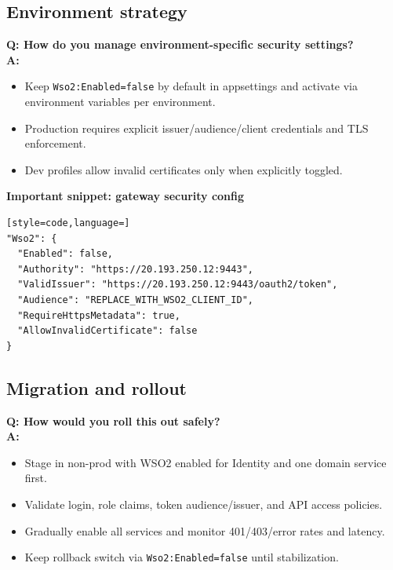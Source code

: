 \documentclass[11pt,a4paper]{article}
\begin{document}
\subsection{Environment strategy}
\textbf{Q: How do you manage environment-specific security settings?}\\
\textbf{A:}
\begin{itemize}[leftmargin=*]
  \item Keep \texttt{Wso2:Enabled=false} by default in appsettings and activate via environment variables per environment.
  \item Production requires explicit issuer/audience/client credentials and TLS enforcement.
  \item Dev profiles allow invalid certificates only when explicitly toggled.
\end{itemize}

\textbf{Important snippet: gateway security config}\newline
\begin{lstlisting}[style=code,language=]
"Wso2": {
  "Enabled": false,
  "Authority": "https://20.193.250.12:9443",
  "ValidIssuer": "https://20.193.250.12:9443/oauth2/token",
  "Audience": "REPLACE_WITH_WSO2_CLIENT_ID",
  "RequireHttpsMetadata": true,
  "AllowInvalidCertificate": false
}
\end{lstlisting}

\subsection{Migration and rollout}
\textbf{Q: How would you roll this out safely?}\\
\textbf{A:}
\begin{itemize}[leftmargin=*]
  \item Stage in non-prod with WSO2 enabled for Identity and one domain service first.
  \item Validate login, role claims, token audience/issuer, and API access policies.
  \item Gradually enable all services and monitor 401/403/error rates and latency.
  \item Keep rollback switch via \texttt{Wso2:Enabled=false} until stabilization.
\end{itemize}
\end{document}

